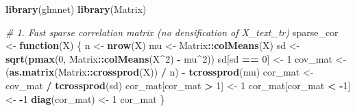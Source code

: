 \documentclass[
]{article}
\newenvironment{Shaded}{\begin{snugshade}}{\end{snugshade}}
\newcommand{\CommentTok}[1]{\textcolor[rgb]{0.56,0.35,0.01}{\textit{#1}}}
\newcommand{\ControlFlowTok}[1]{\textcolor[rgb]{0.13,0.29,0.53}{\textbf{#1}}}
\newcommand{\DecValTok}[1]{\textcolor[rgb]{0.00,0.00,0.81}{#1}}
\newcommand{\FunctionTok}[1]{\textcolor[rgb]{0.13,0.29,0.53}{\textbf{#1}}}
\newcommand{\NormalTok}[1]{#1}
\newcommand{\OtherTok}[1]{\textcolor[rgb]{0.56,0.35,0.01}{#1}}
\newcommand{\SpecialCharTok}[1]{\textcolor[rgb]{0.81,0.36,0.00}{\textbf{#1}}}
\begin{document}
\begin{Shaded}
\begin{Highlighting}[]
\FunctionTok{library}\NormalTok{(glmnet)}
\FunctionTok{library}\NormalTok{(Matrix)}

\CommentTok{\# 1. Fast sparse correlation matrix (no densification of X\_text\_tr)}
\NormalTok{sparse\_cor }\OtherTok{\textless{}{-}} \ControlFlowTok{function}\NormalTok{(X) \{}
\NormalTok{  n  }\OtherTok{\textless{}{-}} \FunctionTok{nrow}\NormalTok{(X)}
\NormalTok{  mu }\OtherTok{\textless{}{-}}\NormalTok{ Matrix}\SpecialCharTok{::}\FunctionTok{colMeans}\NormalTok{(X)}
\NormalTok{  sd }\OtherTok{\textless{}{-}} \FunctionTok{sqrt}\NormalTok{(}\FunctionTok{pmax}\NormalTok{(}\DecValTok{0}\NormalTok{, Matrix}\SpecialCharTok{::}\FunctionTok{colMeans}\NormalTok{(X}\SpecialCharTok{\^{}}\DecValTok{2}\NormalTok{) }\SpecialCharTok{{-}}\NormalTok{ mu}\SpecialCharTok{\^{}}\DecValTok{2}\NormalTok{))}
\NormalTok{  sd[sd }\SpecialCharTok{==} \DecValTok{0}\NormalTok{] }\OtherTok{\textless{}{-}} \DecValTok{1}
\NormalTok{  cov\_mat }\OtherTok{\textless{}{-}}\NormalTok{ (}\FunctionTok{as.matrix}\NormalTok{(Matrix}\SpecialCharTok{::}\FunctionTok{crossprod}\NormalTok{(X)) }\SpecialCharTok{/}\NormalTok{ n) }\SpecialCharTok{{-}} \FunctionTok{tcrossprod}\NormalTok{(mu)}
\NormalTok{  cor\_mat }\OtherTok{\textless{}{-}}\NormalTok{ cov\_mat }\SpecialCharTok{/} \FunctionTok{tcrossprod}\NormalTok{(sd)}
\NormalTok{  cor\_mat[cor\_mat }\SpecialCharTok{\textgreater{}}  \DecValTok{1}\NormalTok{] }\OtherTok{\textless{}{-}}  \DecValTok{1}
\NormalTok{  cor\_mat[cor\_mat }\SpecialCharTok{\textless{}} \SpecialCharTok{{-}}\DecValTok{1}\NormalTok{] }\OtherTok{\textless{}{-}} \SpecialCharTok{{-}}\DecValTok{1}
  \FunctionTok{diag}\NormalTok{(cor\_mat) }\OtherTok{\textless{}{-}} \DecValTok{1}
\NormalTok{  cor\_mat}
\NormalTok{\}}


\end{Highlighting}
\end{Shaded}
\end{document}
